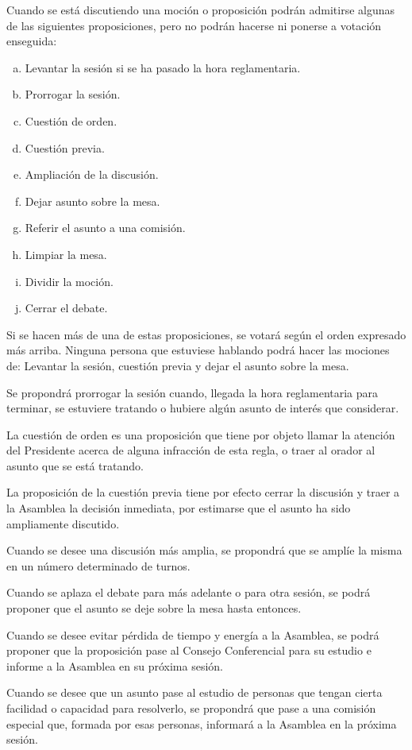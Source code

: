 \article
Cuando se está discutiendo una moción o proposición podrán admitirse algunas de las siguientes proposiciones, pero no podrán hacerse ni ponerse a votación enseguida:
\begin{enumerate}[a)]
    \item Levantar la sesión si se ha pasado la hora reglamentaria.
    \item Prorrogar la sesión.
    \item Cuestión de orden.
    \item Cuestión previa.
    \item Ampliación de la discusión.
    \item Dejar asunto sobre la mesa.
    \item Referir el asunto a una comisión.
    \item Limpiar la mesa.
    \item Dividir la moción.
    \item Cerrar el debate.
\end{enumerate}
Si se hacen más de una de estas proposiciones, se votará según el orden expresado más arriba. Ninguna persona que estuviese hablando podrá hacer las mociones de: Levantar la sesión, cuestión previa y dejar el asunto sobre la mesa.

\article
Se propondrá prorrogar la sesión cuando, llegada la hora reglamentaria para terminar, se estuviere tratando o hubiere algún asunto de interés que considerar.

\article
La cuestión de orden es una proposición que tiene por objeto llamar la atención del Presidente acerca de alguna infracción de esta regla, o traer al orador al asunto que se está tratando.

\article
La proposición de la cuestión previa tiene por efecto cerrar la discusión y traer a la Asamblea la decisión inmediata, por estimarse que el asunto ha sido ampliamente discutido.

\article
Cuando se desee una discusión más amplia, se propondrá que se amplíe la misma en un número determinado de turnos.

\article
Cuando se aplaza el debate para más adelante o para otra sesión, se podrá proponer que el asunto se deje sobre la mesa hasta entonces.

\article
Cuando se desee evitar pérdida de tiempo y energía a la Asamblea, se podrá proponer que la proposición pase al Consejo Conferencial para su estudio e informe a la Asamblea en su próxima sesión.

\article
Cuando se desee que un asunto pase al estudio de personas que tengan cierta facilidad o capacidad para resolverlo, se propondrá que pase a una comisión especial que, formada por esas personas, informará a la Asamblea en la próxima sesión.

